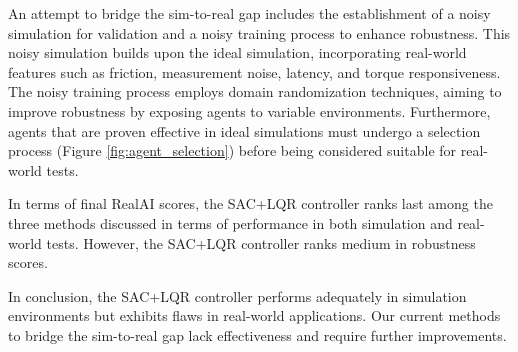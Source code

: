 An attempt to bridge the sim-to-real gap includes the establishment of a noisy simulation for validation and a noisy training process to enhance robustness. This noisy simulation builds upon the ideal simulation, incorporating real-world features such as friction, measurement noise, latency, and torque responsiveness. The noisy training process employs domain randomization techniques, aiming to improve robustness by exposing agents to variable environments. Furthermore, agents that are proven effective in ideal simulations must undergo a selection process (Figure \ref{fig:agent_selection}) before being considered suitable for real-world tests.

In terms of final RealAI scores, the SAC+LQR controller ranks last among the three methods discussed in terms of performance in both simulation and real-world tests. However, the SAC+LQR controller ranks medium in robustness scores.

In conclusion, the SAC+LQR controller performs adequately in simulation environments but exhibits flaws in real-world applications. Our current methods to bridge the sim-to-real gap lack effectiveness and require further improvements.

\cleardoublepage
